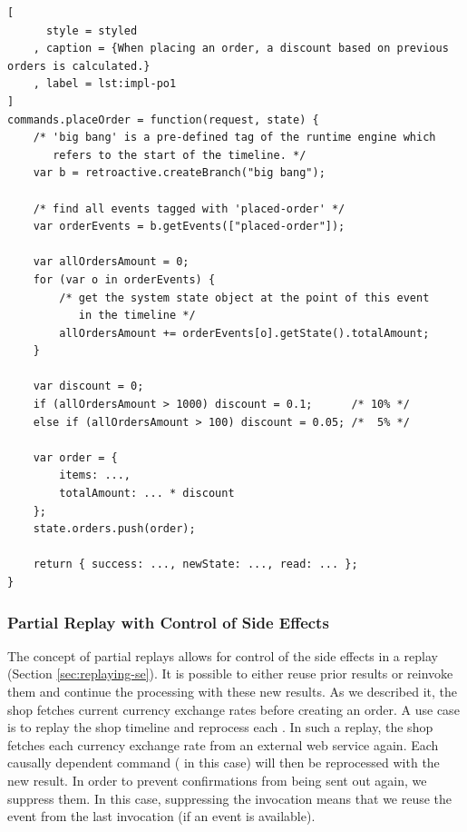 \begin{lstlisting}[
	  style = styled 
	, caption = {When placing an order, a discount based on previous orders is calculated.}
	, label = lst:impl-po1
]
commands.placeOrder = function(request, state) {
	/* 'big bang' is a pre-defined tag of the runtime engine which
	   refers to the start of the timeline. */
	var b = retroactive.createBranch("big bang");

	/* find all events tagged with 'placed-order' */
	var orderEvents = b.getEvents(["placed-order"]);

	var allOrdersAmount = 0;
	for (var o in orderEvents) {
		/* get the system state object at the point of this event 
		   in the timeline */
		allOrdersAmount += orderEvents[o].getState().totalAmount;
	}

	var discount = 0;
	if (allOrdersAmount > 1000) discount = 0.1;      /* 10% */
	else if (allOrdersAmount > 100) discount = 0.05; /*  5% */

	var order = {
		items: ...,
		totalAmount: ... * discount
	};
	state.orders.push(order);

	return { success: ..., newState: ..., read: ... };
}
\end{lstlisting}


\subsubsection{Partial Replay with Control of Side Effects}
The concept of partial replays allows for control of the side effects in a 
replay (Section \ref{sec:replaying-se}).
It is possible to either reuse prior results or reinvoke them and continue 
the processing with these new results. As we described it, the shop fetches 
current currency exchange rates before creating an order. A use case is to 
replay the shop timeline and reprocess each .
In such a replay, the shop fetches each currency exchange rate from an 
external web service again. Each causally dependent command ( 
in this case) will then be reprocessed with the new result.
In order to prevent confirmations from being sent out again, we suppress them.
In this case, suppressing the invocation means that we reuse the event from the 
last  invocation (if an event is available).


